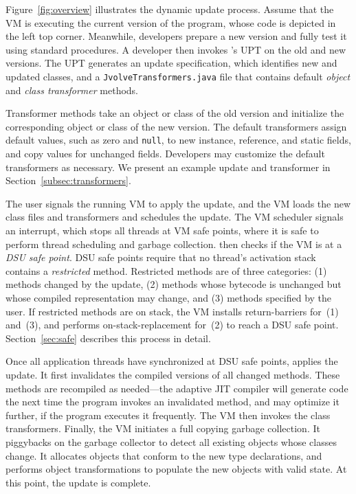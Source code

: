 Figure~\ref{fig:overview} illustrates the dynamic update process.
Assume that the VM is executing the current version of the program,
whose code is depicted in the left top corner.  Meanwhile, developers
prepare a new version and fully test it using standard procedures.
A developer 
then invokes \DSU's \ac{UPT} on the old and
new versions. The \ac{UPT} generates an update specification, which identifies
new and updated classes, and a \texttt{JvolveTransformers.java} file
that contains default \emph{object}
and \emph{class transformer} methods.  

Transformer methods take an
object or class of the old version and 
initialize the corresponding object or class of the new version.  The default
transformers assign default values, such as zero and {\tt null}, to new
instance, reference, and static fields, and copy values for unchanged
fields.  Developers may customize the default transformers as
necessary.  We present an example update and transformer in
Section~\ref{subsec:transformers}. %

The user signals the running VM to apply the update, and the VM loads
the new class files and transformers and schedules the update. The VM
scheduler signals an interrupt, which stops all threads at
VM safe points, where it is safe to perform thread scheduling and garbage collection.  \DSU{} then checks if the VM is %
at a \emph{DSU safe point}. DSU safe points require that no thread's
activation stack contains a \emph{restricted} method.  Restricted
methods are of three categories: (1) methods changed by the update,
(2) methods whose bytecode is unchanged but whose compiled
representation may change, and (3) methods specified by the user. If
restricted methods are on stack, the VM installs return-barriers
for~(1) and~(3), and performs on-stack-replacement for~(2) to reach a
DSU safe point.  Section~\ref{sec:safe} describes this process in
detail.

Once all application threads have synchronized at DSU safe points, \DSU{}
applies the update. It first invalidates the compiled versions of all
changed methods.
These methods are
recompiled as needed---the adaptive JIT compiler will
generate code the next time the program invokes an invalidated method,
and may optimize it further, if the program executes it frequently.
%
The VM then invokes the
class transformers.  Finally, the VM initiates a full copying garbage collection. It
piggybacks on the garbage collector to detect all existing objects
whose classes change. It allocates objects that conform to the new type
declarations, and performs object transformations to populate the new
objects with valid state. %
At this point, the update is complete.

